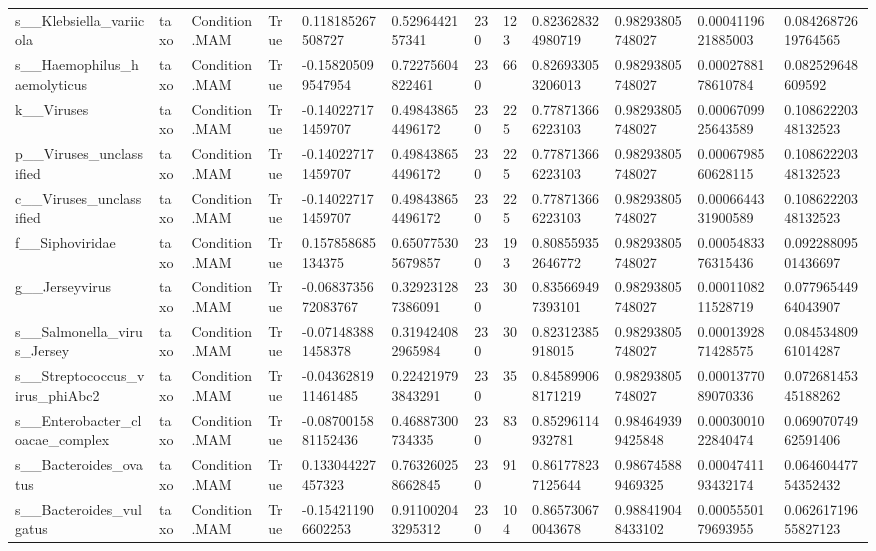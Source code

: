 \begin{longtable}{llllllllllll}
s\_\_Klebsiella\_variicola & taxo & Condition.MAM & True & 0.118185267508727 & 0.5296442157341 & 230 & 123 & 0.823628324980719 & 0.98293805748027 & 0.0004119621885003 & 0.08426872619764565 \\
s\_\_Haemophilus\_haemolyticus & taxo & Condition.MAM & True & -0.158205099547954 & 0.72275604822461 & 230 & 66 & 0.826933053206013 & 0.98293805748027 & 0.0002788178610784 & 0.082529648609592 \\
k\_\_Viruses & taxo & Condition.MAM & True & -0.140227171459707 & 0.498438654496172 & 230 & 225 & 0.778713666223103 & 0.98293805748027 & 0.0006709925643589 & 0.10862220348132523 \\
p\_\_Viruses\_unclassified & taxo & Condition.MAM & True & -0.140227171459707 & 0.498438654496172 & 230 & 225 & 0.778713666223103 & 0.98293805748027 & 0.0006798560628115 & 0.10862220348132523 \\
c\_\_Viruses\_unclassified & taxo & Condition.MAM & True & -0.140227171459707 & 0.498438654496172 & 230 & 225 & 0.778713666223103 & 0.98293805748027 & 0.0006644331900589 & 0.10862220348132523 \\
f\_\_Siphoviridae & taxo & Condition.MAM & True & 0.157858685134375 & 0.650775305679857 & 230 & 193 & 0.808559352646772 & 0.98293805748027 & 0.0005483376315436 & 0.09228809501436697 \\
g\_\_Jerseyvirus & taxo & Condition.MAM & True & -0.0683735672083767 & 0.329231287386091 & 230 & 30 & 0.835669497393101 & 0.98293805748027 & 0.0001108211528719 & 0.07796544964043907 \\
s\_\_Salmonella\_virus\_Jersey & taxo & Condition.MAM & True & -0.071483881458378 & 0.319424082965984 & 230 & 30 & 0.82312385918015 & 0.98293805748027 & 0.0001392871428575 & 0.08453480961014287 \\
s\_\_Streptococcus\_virus\_phiAbc2 & taxo & Condition.MAM & True & -0.0436281911461485 & 0.224219793843291 & 230 & 35 & 0.845899068171219 & 0.98293805748027 & 0.0001377089070336 & 0.07268145345188262 \\
s\_\_Enterobacter\_cloacae\_complex & taxo & Condition.MAM & True & -0.0870015881152436 & 0.46887300734335 & 230 & 83 & 0.85296114932781 & 0.984649399425848 & 0.0003001022840474 & 0.06907074962591406 \\
s\_\_Bacteroides\_ovatus & taxo & Condition.MAM & True & 0.133044227457323 & 0.763260258662845 & 230 & 91 & 0.861778237125644 & 0.986745889469325 & 0.0004741193432174 & 0.06460447754352432 \\
s\_\_Bacteroides\_vulgatus & taxo & Condition.MAM & True & -0.154211906602253 & 0.911002043295312 & 230 & 104 & 0.865730670043678 & 0.988419048433102 & 0.0005550179693955 & 0.06261719655827123 \\

\end{longtable}
